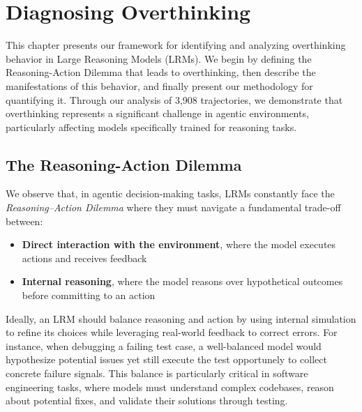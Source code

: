 \chapter{Diagnosing Overthinking}
\label{overthinking}

This chapter presents our framework for identifying and analyzing overthinking behavior in Large Reasoning Models (LRMs). We begin by defining the Reasoning-Action Dilemma that leads to overthinking, then describe the manifestations of this behavior, and finally present our methodology for quantifying it. Through our analysis of 3,908 trajectories, we demonstrate that overthinking represents a significant challenge in agentic environments, particularly affecting models specifically trained for reasoning tasks.

\section{The Reasoning-Action Dilemma}
\label{sec:dilemma_detailed}

We observe that, in agentic decision-making tasks, LRMs constantly face the \emph{Reasoning–Action Dilemma} where they must navigate a fundamental trade-off between:
\begin{itemize}
    \item \textbf{Direct interaction with the environment}, where the model executes actions and receives feedback
    \item \textbf{Internal reasoning}, where the model reasons over hypothetical outcomes before committing to an action
\end{itemize}

Ideally, an LRM should balance reasoning and action by using internal simulation to refine its choices while leveraging real-world feedback to correct errors. For instance, when debugging a failing test case, a well-balanced model would hypothesize potential issues yet still execute the test opportunely to collect concrete failure signals. This balance is particularly critical in software engineering tasks, where models must understand complex codebases, reason about potential fixes, and validate their solutions through testing.

